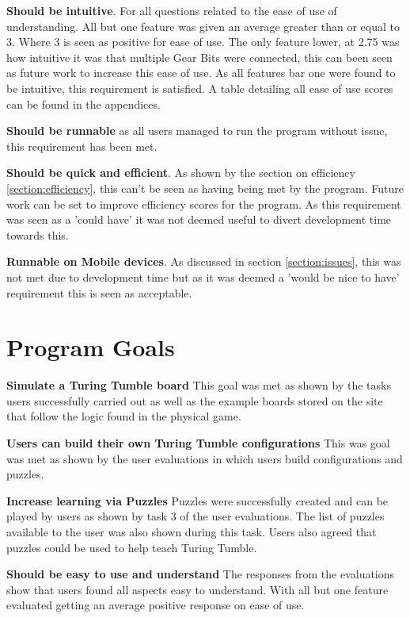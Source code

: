 \documentclass{l4proj}
\begin{document}
\textbf{Should be intuitive}. For all questions related to the ease of use of understanding. All but one feature was given an average greater than or equal to 3. Where 3 is seen as positive for ease of use. The only feature lower, at 2.75 was how intuitive it was that multiple Gear Bits were connected, this can been seen as future work to increase this ease of use. As all features bar one were found to be intuitive, this requirement is satisfied. A table detailing all ease of use scores can be found in the appendices. 

\textbf{Should be runnable} as all users managed to run the program without issue, this requirement has been met.

\textbf{Should be quick and efficient}. As shown by the section on efficiency \ref{section:efficiency}, this can't be seen as having being met by the program. Future work can be set to improve efficiency scores for the program. As this requirement was seen as a 'could have' it was not deemed useful to divert development time towards this. 

\textbf{Runnable on Mobile devices}. As discussed in section \ref{section:issues}, this was not met due to development time but as it was deemed a 'would be nice to have' requirement this is seen as acceptable. 

\section{Program Goals}

\textbf{Simulate a Turing Tumble board} This goal was met as shown by the tasks users successfully carried out as well as the example boards stored on the site that follow the logic found in the physical game.

\textbf{Users can build their own Turing Tumble configurations} This was goal was met as shown by the user evaluations in which users build configurations and puzzles.

\textbf{Increase learning via Puzzles} Puzzles were successfully created and can be played by users as shown by task 3 of the user evaluations. The list of puzzles available to the user was also shown during this task. Users also agreed that puzzles could be used to help teach Turing Tumble.

\textbf{Should be easy to use and understand} The responses from the evaluations show that users found all aspects easy to understand. With all but one feature evaluated getting an average positive response on ease of use. 
\end{document}
